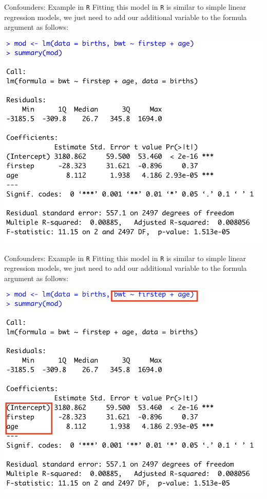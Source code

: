 \documentclass[10pt,t]{beamer}
\begin{document}
\begin{frame}{Confounders: Example in \texttt{R}}
Fitting this model in \texttt{R} is similar to simple linear regression models, we just need to add our additional variable to the formula argument as follows:

\vspace{0.3cm}

\centering \includegraphics[scale=0.4]{confound_code.png}
\end{frame}

\begin{frame}{Confounders: Example in \texttt{R}}
Fitting this model in \texttt{R} is similar to simple linear regression models, we just need to add our additional variable to the formula argument as follows:

\vspace{0.3cm}

\centering \includegraphics[scale=0.4]{confound_code2.png}
\end{frame}
\end{document}
